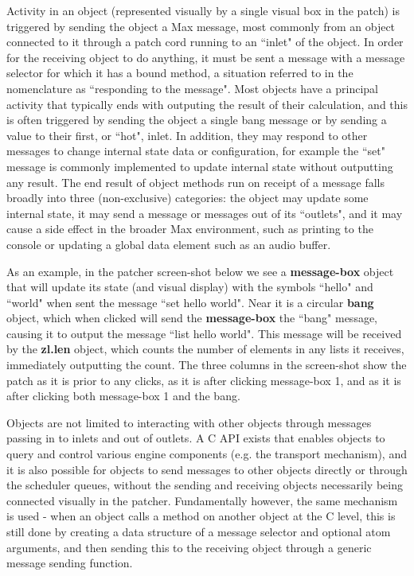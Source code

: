 \documentclass[acmsmall]{acmart}
\begin{document}
Activity in an object (represented visually by a single visual box in the patch) is triggered
by sending the object a Max message, most commonly from an object connected to it
through a patch cord running to an ``inlet" of the object. 
In order for the receiving object to do anything, it must 
be sent a message with a message selector for which it has a bound method,
a situation referred to in the nomenclature as ``responding to the message". Most objects
have a principal activity that typically ends with outputing the result of their calculation, and this is
often triggered by sending the object a single bang message or by sending a value to 
their first, or ``hot", inlet. In addition, they may respond to other messages to change internal state
data or configuration, for example the ``set" message is commonly implemented to update internal
state without outputting any result. The end result of object methods run on receipt of a message falls broadly
into three (non-exclusive) categories: the object may update some internal state, it may send a
message or messages out of its ``outlets", and it may cause a side effect in the broader
Max environment, such as printing to the console or updating a global data element such as
an audio buffer.

As an example, in the patcher screen-shot below we see a \textbf{message-box} object that will update
its state (and visual display) with the symbols ``hello" and ``world" when sent the message 
``set hello world". Near it is a circular \textbf{bang} object, which when clicked will send the
\textbf{message-box} the ``bang" message, causing it to output the message ``list hello world".
This message will be received by the \textbf{zl.len} object, which counts the number of elements 
in any lists it receives, immediately outputting the count. The three columns in the screen-shot
show the patch as it is prior to any clicks, as it is after clicking message-box 1,
and as it is after clicking both message-box 1 and the bang.


Objects are not limited to interacting with other objects through messages passing in to inlets and out of 
outlets. A C API exists that enables objects to query and control various engine components (e.g. 
the transport mechanism), and it is also possible for objects to send messages to other objects 
directly or through the scheduler queues, without the sending and receiving objects 
necessarily being connected visually in the patcher. Fundamentally however, the same mechanism
is used - when an object calls a method on another object at the C level, this is still done
by creating a data structure of a message selector and optional atom arguments, 
and then sending this to the receiving object through a generic message sending function.
\end{document}
